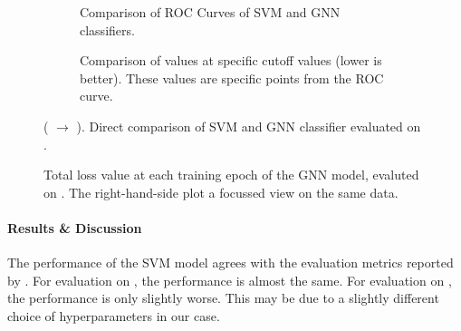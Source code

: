 \documentclass[
	fontsize=10pt, %
	twoside=false, %
	secnumdepth=1, %
  toc=indentunnumbered %
]{kaobook}
\begin{document}



\begin{figure}[h]
  \centering
  \begin{subfigure}[h]{0.49\linewidth}
    \caption{Comparison of ROC Curves of SVM and GNN classifiers.}
  \end{subfigure}
  \begin{subfigure}[h]{0.49\linewidth}
    \caption{Comparison of \FPR{} values at specific \TPR{} cutoff values (lower is better). These
      values are specific points from the ROC curve.}
  \end{subfigure}
  \caption{(\ADMap{} $\rightarrow$ \ReconMap).
    Direct comparison of SVM and GNN classifier evaluated on \ReconMap{}.}
  \label{fig:svm-repro-reconmapolder-roc-train-test}
\end{figure}
\begin{figure}[h]
  \centering
  \begin{subfigure}[h]{0.49\linewidth}
  \end{subfigure}
  \begin{subfigure}[h]{0.49\linewidth}
  \end{subfigure}
  \caption{Total loss value at each training epoch of the GNN model, evaluted on
    \ReconMap{}. The right-hand-side plot a focussed view on the same data.}
  \label{fig:svm-repro-reconmapolder-loss}
\end{figure}



\paragraph{Results \& Discussion}
The performance of the SVM model agrees with the evaluation metrics reported by
\nielsen{}. For evaluation on \PDMap, the performance is almost the same. For
evaluation on \ReconMap{}, the performance is only slightly worse. This may be due
to a slightly different choice of hyperparameters in our case.
\end{document}
